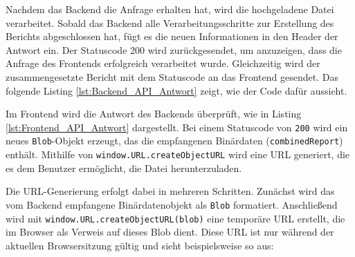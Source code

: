 Nachdem das Backend die Anfrage erhalten hat, wird die hochgeladene Datei verarbeitet. Sobald das Backend alle Verarbeitungsschritte zur Erstellung des Berichts abgeschlossen hat, fügt es die neuen Informationen in den Header der Antwort ein. Der Statuscode 200 wird zurückgesendet, um anzuzeigen, dass die Anfrage des Frontends erfolgreich verarbeitet wurde. Gleichzeitig wird der zusammengesetzte Bericht mit dem Statuscode an das Frontend gesendet. Das folgende Listing \ref{lst:Backend_API_Antwort} zeigt, wie der Code dafür aussieht.


Im Frontend wird die Antwort des Backends überprüft, wie in Listing \ref{lst:Frontend_API_Antwort} dargestellt. Bei einem Statuscode von \texttt{200} wird ein neues \texttt{\ac{Blob}}-Objekt erzeugt, das die empfangenen Binärdaten (\texttt{combinedReport}) enthält. Mithilfe von \texttt{window.URL.createObjectURL} wird eine \ac{URL} generiert, die es dem Benutzer ermöglicht, die Datei herunterzuladen.


Die \ac{URL}-Generierung erfolgt dabei in mehreren Schritten. Zunächst wird das vom Backend empfangene Binärdatenobjekt als \texttt{\ac{Blob}} formatiert.  Anschließend wird mit \texttt{window.URL.createObjectURL(blob)} eine temporäre \ac{URL} erstellt, die im Browser als Verweis auf dieses \ac{Blob} dient. Diese \ac{URL} ist nur während der aktuellen Browsersitzung gültig und sieht beispielsweise so aus:

